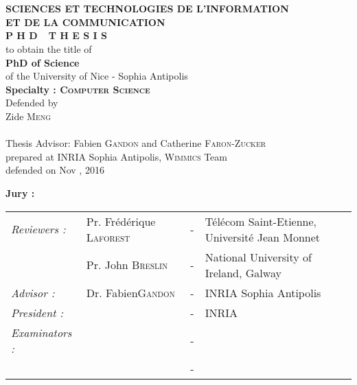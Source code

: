 \begin{titlepage}
\begin{center}
 \\
\vspace*{0.3cm}
 \\
\noindent \textbf{SCIENCES ET TECHNOLOGIES DE L'INFORMATION \\ ET DE LA COMMUNICATION} \\
\vspace*{0.5cm}
\noindent \Huge \textbf{P H D\ \ T H E S I S} \\
\vspace*{0.3cm}
\noindent \large {to obtain the title of} \\
\vspace*{0.3cm}
\noindent \LARGE \textbf{PhD of Science} \\
\vspace*{0.3cm}
\noindent \Large of the University of Nice - Sophia Antipolis \\
\noindent \Large \textbf{Specialty : \textsc{Computer Science}}\\
\vspace*{0.4cm}
\noindent \large {Defended by\\}
\noindent \LARGE Zide \textsc{Meng} \\
\vspace*{0.4cm}
\\
\vspace*{0.4cm}
\noindent \Large Thesis Advisor: Fabien \textsc{Gandon} and Catherine \textsc{Faron-Zucker} \\
\vspace*{0.2cm}
\noindent \Large prepared at INRIA Sophia Antipolis, \textsc{Wimmics} Team\\
\vspace*{0.2cm}
\noindent \large defended on Nov , 2016 \\
\vspace*{0.5cm}
\end{center}
\noindent \large \textbf{Jury :} \\
\begin{center}
\noindent \large 
\begin{tabular}{llcl}
      \textit{Reviewers :}	&Pr. Fr\'ed\'erique \textsc{Laforest }		& - &T\'el\'ecom Saint-Etienne, Universit\'e Jean Monnet\\
				&Pr. John \textsc{Breslin}		& - & National University of Ireland, Galway\\
      \textit{Advisor :}	&Dr. Fabien\textsc{Gandon}		& - & INRIA Sophia Antipolis \\
      \textit{President :}	&  \textsc{}		& - & INRIA \\
      \textit{Examinators :}   &  \textsc{}          & - & \\
      				&  \textsc{}			& - & \\
      				

\end{tabular}
\end{center}
\end{titlepage}
